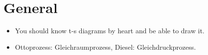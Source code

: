 \section*{General}
\begin{itemize}
    \item You should know t-s diagrams by heart and be able to draw it.
    \item Ottoprozess: Gleichraumprozess, Diesel: Gleichdruckprozess.
    
\end{itemize}


